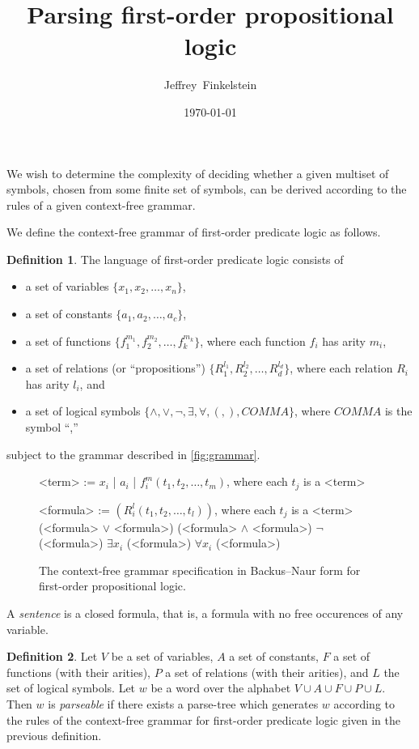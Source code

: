 \documentclass[draft]{article}
\author{Jeffrey~Finkelstein}
\title{Parsing first-order propositional logic}
\date{\today}
\theoremstyle{definition}
\newtheorem{definition}{Definition}
\begin{document}
\maketitle

We wish to determine the complexity of deciding whether a given multiset of symbols, chosen from some finite set of symbols, can be derived according to the rules of a given context-free grammar.

We define the context-free grammar of first-order predicate logic as follows.
\begin{definition}
  The language of first-order predicate logic consists of
  \begin{itemize}
  \item a set of variables $\{x_1, x_2, \ldots, x_n\}$,
  \item a set of constants $\{a_1, a_2, \ldots, a_c\}$,
  \item a set of functions $\{f^{m_1}_1, f^{m_2}_2, \ldots, f^{m_k}_k\}$, where each function $f_i$ has arity $m_i$,
  \item a set of relations (or ``propositions'') $\{R^{l_1}_1, R^{l_2}_2, \ldots, R^{l_d}_d\}$, where each relation $R_i$ has arity $l_i$, and
  \item a set of logical symbols $\{\land, \lor, \lnot, \exists, \forall, (, ), COMMA \}$, where $COMMA$ is the symbol ``,''
  \end{itemize}
  subject to the grammar described in \autoref{fig:grammar}.
  \begin{figure}
    \caption{\label{fig:grammar}The context-free grammar specification in Backus--Naur form for first-order propositional logic.}
  \begin{grammar}
    <term> := $x_i$ | $a_i$ | $f^m_i(t_1, t_2, \ldots, t_m)$, where each $t_j$ is a <term>

    <formula> := $(R^l_i(t_1, t_2, \ldots, t_l))$, where each $t_j$ is a <term>
    \alt (<formula> $\lor$ <formula>)
    \alt (<formula> $\land$ <formula>)
    \alt $\lnot$ (<formula>)
    \alt $\exists x_i$ (<formula>)
    \alt $\forall x_i$ (<formula>)
  \end{grammar}
  \end{figure}
  A \emph{sentence} is a closed formula, that is, a formula with no free occurences of any variable.
\end{definition}
\begin{definition}
  Let $V$ be a set of variables, $A$ a set of constants, $F$ a set of functions (with their arities), $P$ a set of relations (with their arities), and $L$ the set of logical symbols.
  Let $w$ be a word over the alphabet $V\cup A\cup F\cup P\cup L$.
  Then $w$ is \emph{parseable} if there exists a parse-tree which generates $w$ according to the rules of the context-free grammar for first-order predicate logic given in the previous definition.
\end{definition}
\end{document}
